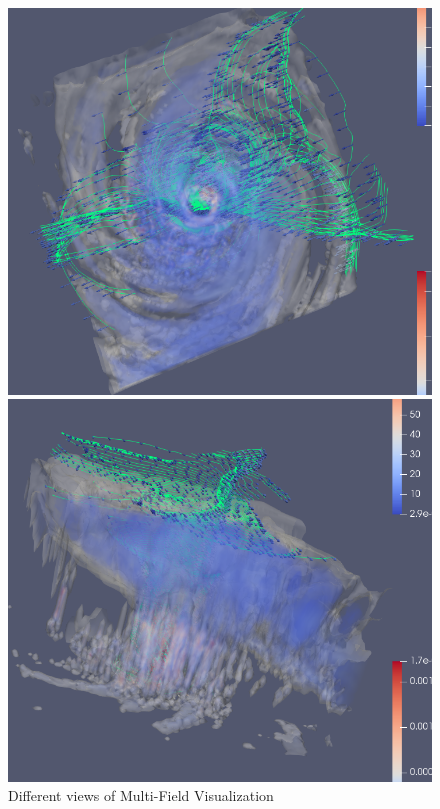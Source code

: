 \documentclass[a4paper,11pt]{article}
\theoremstyle{mytheor}
\begin{document}
\begin{figure}[!h]
    \centering
    \includegraphics[scale=0.6]{Figures/P3_1.PNG}
    
    \vspace{0.5 cm}
    \includegraphics[scale=0.6]{Figures/P3_2.PNG}
    \caption{Different views of Multi-Field Visualization}
    \label{p3_1}
\end{figure}
\end{document}
